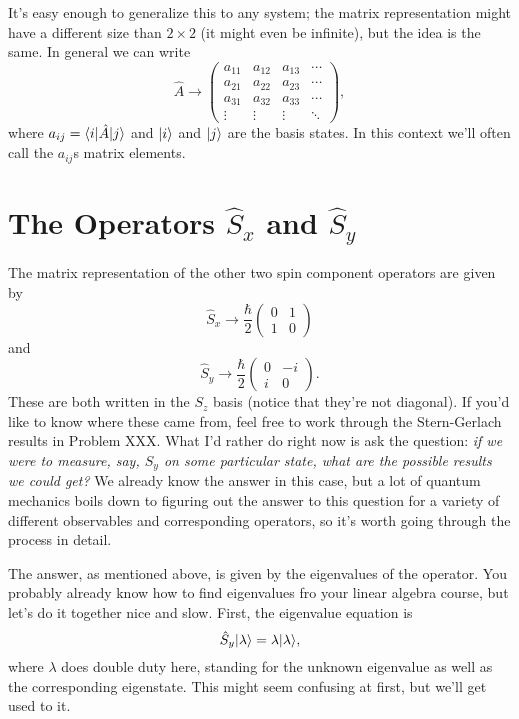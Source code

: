 It's easy enough to generalize this to any system; the matrix representation might have a different size than $2 \times 2$ (it might even be infinite), but the idea is the same.  In general we can write
\begin{equation}
\hat{A} \to \begin{pmatrix} 
a_{11} & a_{12} & a_{13} & \cdots \\ 
a_{21} & a_{22} & a_{23} & \cdots \\
a_{31} & a_{32} & a_{33} & \cdots \\
\vdots & \vdots & \vdots  & \ddots
\end{pmatrix},
\end{equation}
where $a_{ij} = \langle i | \hat{A} | j \rangle$ and $| i \rangle$ and $| j \rangle$ are the basis states.  In this context we'll often call the $a_{ij}$s matrix elements.


\section{The Operators $\hat{S}_x$ and $\hat{S}_y$}

The matrix representation of the other two spin component operators are given by
\begin{equation}
\hat{S}_x \to \frac{\hbar}{2} \begin{pmatrix} 0 & 1 \\ 1 & 0 \end{pmatrix}
\end{equation}
and 
\begin{equation}
\hat{S}_y \to \frac{\hbar}{2} \begin{pmatrix} 0 & -i \\ i & 0 \end{pmatrix}.
\end{equation}
These are both written in the $S_z$ basis (notice that they're not diagonal).  If you'd like to know where these came from, feel free to work through the Stern-Gerlach results in Problem XXX.  What I'd rather do right now is ask the question: \emph{if we were to measure, say, $S_y$ on some particular state, what are the possible results we could get?}  We already know the answer in this case, but a lot of quantum mechanics boils down to figuring out the answer to this question for a variety of different observables and corresponding operators, so it's worth going through the process in detail.

The answer, as mentioned above, is given by the eigenvalues of the operator. You probably already know how to find eigenvalues fro your linear algebra course, but let's do it together nice and slow.  First, the eigenvalue equation is
\begin{equation}
\label{eq_eigeny}
\hat{S}_y | \lambda \rangle = \lambda | \lambda \rangle,
\end{equation}
where $\lambda$ does double duty here, standing for the unknown eigenvalue as well as the corresponding eigenstate.  This might seem confusing at first, but we'll get used to it. 

